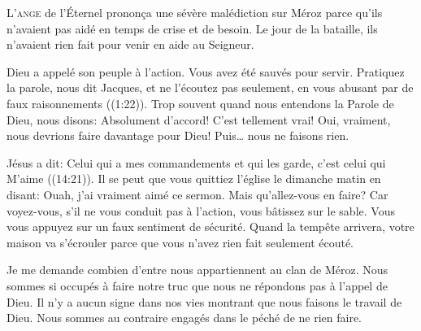 \dvrule







\lettrine{L}{'ange} de l'Éternel pronon\c{c}a une sévère malédiction sur Méroz
 parce qu'ils n'avaient pas aidé en temps de crise et de besoin.
 Le jour de la bataille, ils n'avaient rien fait pour venir en aide au Seigneur.

Dieu a appelé son peuple à l'action. Vous avez été sauvés pour servir.
 \Og Pratiquez la parole, nous dit Jacques,
 et ne l'écoutez pas seulement,
 en vous abusant par de faux raisonnements \Fg{} ((1:22)).
 Trop souvent quand nous entendons la Parole de Dieu, nous disons:
 \Og Absolument d'accord! C'est tellement vrai!
 Oui, vraiment, nous devrions faire davantage pour Dieu! \Fg{}
 Puis\dots{} nous ne faisons rien.


Jésus a dit:
 \Og Celui qui a mes commandements et qui les garde,
 c'est celui qui M'aime \Fg{} ((14:21)).
 Il se peut que vous quittiez l'église le dimanche matin en disant:
 \Og Ouah, j'ai vraiment aimé ce sermon. \Fg{}
 Mais qu'allez-vous en faire? Car voyez-vous, s'il ne vous conduit pas
 à l'action, vous bâtissez sur le sable.
 Vous vous appuyez sur un faux sentiment de sécurité.
 Quand la tempête arrivera, votre maison va s'écrouler
 parce que vous n'avez rien fait \ocadr seulement écouté.

Je me demande combien d'entre nous appartiennent au clan de Méroz.
 Nous sommes si occupés à faire \Og notre truc \Fg{} que nous ne répondons pas
 à l'appel de Dieu. Il n'y a aucun signe dans nos vies montrant
 que nous faisons le travail de Dieu.
 Nous sommes au contraire engagés dans le péché de ne rien faire. 

